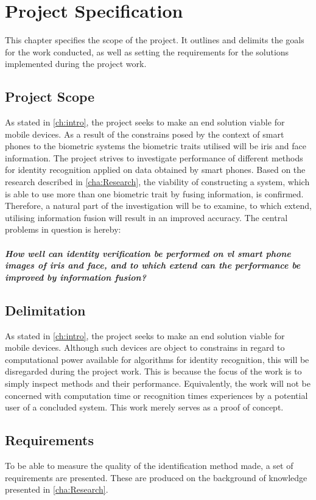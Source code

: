 \chapter{Project Specification}\glsresetall
This chapter specifies the scope of the project. It outlines and delimits the goals for the work conducted, as well as setting the requirements for the solutions implemented during the project work. 

\section{Project Scope}
As stated in \autoref{ch:intro}, the project seeks to make an end solution viable for mobile devices. As a result of the constrains posed by the context of smart phones to the biometric systems the biometric traits utilised will be iris and face information. The project strives to investigate performance of different methods for identity recognition applied on data obtained by smart phones. Based on the research described in \autoref{cha:Research}, the viability of constructing a system, which is able to use more than one biometric trait by fusing information, is confirmed. Therefore, a natural part of the investigation will be to examine, to which extend, utilising information fusion will result in an improved accuracy. The central problems in question is hereby:\\\\
\textit{\textbf{How well can identity verification be performed on \gls{vl} smart phone images of iris and face, and to which extend can the performance be improved by information fusion?}}

\section{Delimitation}\label{sec:deliproject}
As stated in \autoref{ch:intro}, the project seeks to make an end solution viable for mobile devices. Although such devices are object to constrains in regard to computational power available for algorithms for identity recognition, this will be disregarded during the project work. This is because the focus of the work is to simply inspect methods and their performance. Equivalently, the work will not be concerned with computation time or recognition times experiences by a potential user of a concluded system. This work merely serves as a proof of concept.

\section{Requirements}\label{ch:req}
To be able to measure the quality of the identification method made, a set of requirements are presented. These are produced on the background of knowledge presented in \autoref{cha:Research}.

